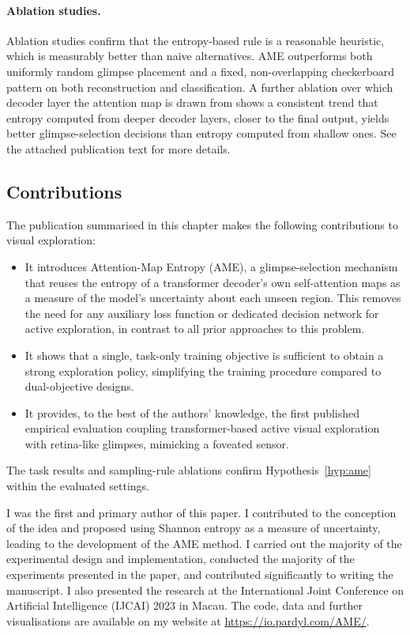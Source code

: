 \paragraph{Ablation studies.} Ablation studies confirm that the entropy-based rule is a reasonable heuristic, which is measurably better than naive alternatives. AME outperforms both uniformly random glimpse placement and a fixed, non-overlapping checkerboard pattern on both reconstruction and classification. A further ablation over which decoder layer the attention map is drawn from shows a consistent trend that entropy computed from deeper decoder layers, closer to the final output, yields better glimpse-selection decisions than entropy computed from shallow ones. See the attached publication text for more details.

\subsection{Contributions}
\label{sec:contributions-ame}

The publication summarised in this chapter makes the following contributions to visual exploration:

\begin{itemize}
    \item It introduces Attention-Map Entropy (AME), a glimpse-selection mechanism that reuses the entropy of a transformer decoder's own self-attention maps as a measure of the model's uncertainty about each unseen region. This removes the need for any auxiliary loss function or dedicated decision network for active exploration, in contrast to all prior approaches to this problem.
    \item It shows that a single, task-only training objective is sufficient to obtain a strong exploration policy, simplifying the training procedure compared to dual-objective designs.
    \item It provides, to the best of the authors' knowledge, the first published empirical evaluation coupling transformer-based active visual exploration with retina-like glimpses, mimicking a foveated sensor.
\end{itemize}

The task results and sampling-rule ablations confirm Hypothesis~\ref{hyp:ame} within the evaluated settings.

I was the first and primary author of this paper. I contributed to the conception of the idea and proposed using Shannon entropy as a measure of uncertainty, leading to the development of the AME method. I carried out the majority of the experimental design and implementation, conducted the majority of the experiments presented in the paper, and contributed significantly to writing the manuscript. I also presented the research at the International Joint Conference on Artificial Intelligence (IJCAI) 2023 in Macau. The code, data and further visualisations are available on my website at \url{https://io.pardyl.com/AME/}.
